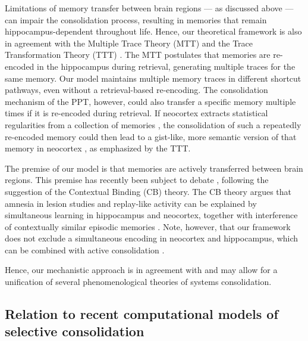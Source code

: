 Limitations of memory transfer between brain regions --- as discussed above --- can impair the consolidation process, resulting in memories that remain hippocampus-\allowbreak dependent throughout life.
Hence, our theoretical framework is also in agreement with the Multiple Trace Theory (MTT) \cite{Nadel1997} and the Trace Transformation Theory (TTT) \cite{Winocur2010, Winocur2011}.
The MTT postulates that memories are re-encoded in the hippocampus during retrieval, generating multiple traces for the same memory. Our model maintains multiple memory traces in different shortcut pathways, even without a retrieval-based re-encoding. The consolidation mechanism of the PPT, however, could also transfer a specific memory multiple times if it is re-encoded during retrieval. If neocortex extracts statistical regularities from a collection of memories \cite{McClelland1995}, the consolidation of such a repeatedly re-encoded memory could then lead to a gist-like, more semantic version of that memory in neocortex \cite{Nadel1997, Winocur2011, Levine2002}, as emphasized by the TTT.

The premise of our model is that memories are actively transferred between brain regions. This premise has recently been subject to debate \cite{Yonelinas2019, Antony2019, Yonelinas2019a}, following the suggestion of the Contextual Binding (CB) theory. The CB theory argues that amnesia in lesion studies and replay-like activity can be explained by simultaneous learning in hippocampus and neocortex, together with interference of contextually similar episodic memories \cite{Yonelinas2019}. Note, however, that our framework does not exclude a simultaneous encoding in neocortex and hippocampus, which can be combined with active consolidation \cite{Dudai2015, Pohlchen2020}.

Hence, our mechanistic approach is in agreement with and may allow for a unification of several phenomenological theories of systems consolidation.

\subsection{Relation to recent computational models of selective consolidation}
\label{ssec:relation_selective_consolidation}

